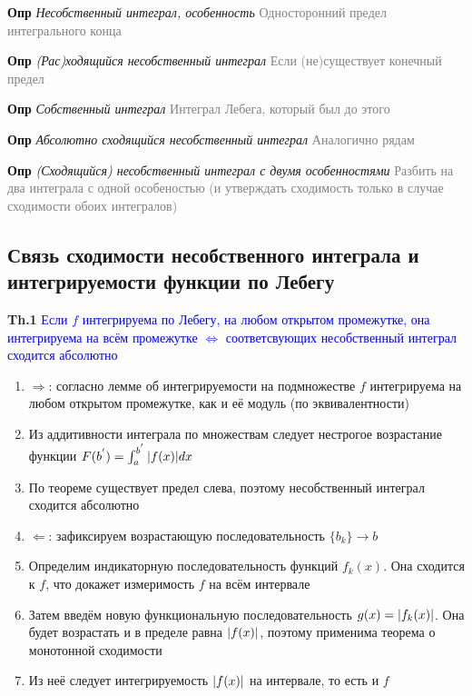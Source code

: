 \documentclass[a4paper, 14pt]{article}
\begin{document}
    \textbf{Опр} \textit{Несобственный интеграл, особенность} \textcolor{gray}{Односторонний предел интегрального конца}

    \textbf{Опр} \textit{(Рас)ходящийся несобственный интеграл} \textcolor{gray}{Если (не)существует конечный предел}

    \textbf{Опр} \textit{Собственный интеграл} \textcolor{gray}{Интеграл Лебега, который был до этого}

    \textbf{Опр} \textit{Абсолютно сходящийся несобственный интеграл} \textcolor{gray}{Аналогично рядам}

    \textbf{Опр} \textit{(Сходящийся) несобственный интеграл с двумя особенностями} \textcolor{gray}{Разбить на два
    интеграла с одной особеностью (и утверждать сходимость только в случае сходимости обоих интегралов)}

    \subsection{Связь сходимости несобственного интеграла и интегрируемости функции по Лебегу}

    \textbf{Th.1} \textcolor{blue}{Если $f$ интегрируема по Лебегу, на любом открытом промежутке, она
    интегрируема на всём промежутке $\Leftrightarrow$ соответсвующих несобственный интеграл сходится абсолютно}

    \begin{enumerate}
        \item $\Rightarrow$: согласно лемме об интегрируемости на подмножестве $f$ интегрируема на любом открытом
        промежутке, как и её модуль (по эквивалентности)
        \item Из аддитивности интеграла по множествам следует нестрогое возрастание функции $F(b^{'}) = \int_a^{b^{'}} \abs{f(x
            )} dx $
        \item По теореме существует предел слева, поэтому несобственный интеграл сходится абсолютно
        \item $\Leftarrow$: зафиксируем возрастающую последовательность $\{b_k\} \rightarrow b$
        \item Определим индикаторную последовательность функций $f_k(x)$.
        Она сходится к $f$, что докажет измеримость $f$ на всём интервале
        \item Затем введём новую функциональную последовательность $g(x) = \abs{f_k(x)}$.
        Она будет возрастать и в пределе равна $\abs{f(x)}$, поэтому применима теорема о монотонной сходимости
        \item Из неё следует интегрируемость $\abs{f(x)}$ на интервале, то есть и $f$
    \end{enumerate}
\end{document}
